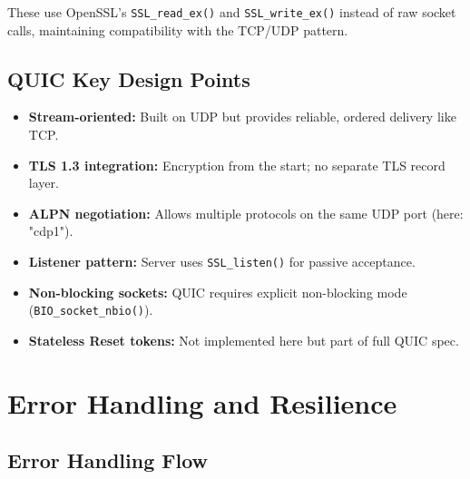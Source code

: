 \documentclass[12pt,a4paper]{article}
\begin{document}
These use OpenSSL's \texttt{SSL\_read\_ex()} and \texttt{SSL\_write\_ex()} instead of raw socket calls, maintaining compatibility with the TCP/UDP pattern.

\subsection{QUIC Key Design Points}

\begin{tcolorbox}[colback=gray!5,colframe=quicgreen,title=QUIC Design Considerations]
\begin{itemize}
  \item \textbf{Stream-oriented:} Built on UDP but provides reliable, ordered delivery like TCP.
  \item \textbf{TLS 1.3 integration:} Encryption from the start; no separate TLS record layer.
  \item \textbf{ALPN negotiation:} Allows multiple protocols on the same UDP port (here: "cdp1").
  \item \textbf{Listener pattern:} Server uses \texttt{SSL\_listen()} for passive acceptance.
  \item \textbf{Non-blocking sockets:} QUIC requires explicit non-blocking mode (\texttt{BIO\_socket\_nbio()}).
  \item \textbf{Stateless Reset tokens:} Not implemented here but part of full QUIC spec.
\end{itemize}
\end{tcolorbox}

\section{Error Handling and Resilience}
\label{sec:errors}

\subsection{Error Handling Flow}
\end{document}
